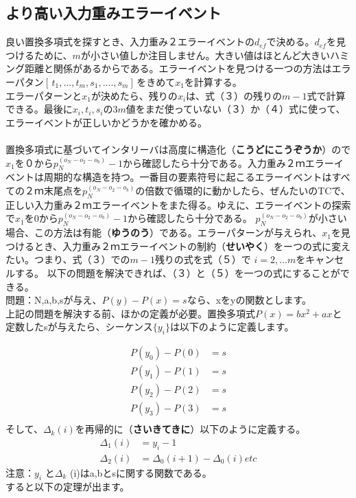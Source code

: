 \documentclass[24 pts]{article}
\begin{document}
\subsection{より高い入力重みエラーイベント}
良い置換多項式を探すとき、入力重み２エラーイベントの$d_{ef}$で決める。$d_{ef}$を見つけるために、$m$が小さい値しか注目しません。大きい値はほとんど大きいハミング距離と関係があるからである。エラーイベントを見つける一つの方法はエラーパタン$[\,t_1,...,t_m,s_1,....,s_m]\,$をきめて$x_1$を計算する。\\エラーパターンと$x_1$が決めたら、残りの$x_i$は、式（３）の残りの$ m-1$式で計算できる。最後に$x_i,t_i,s_i$の$3m$値をまだ使っていない（３）か（４）式に使って、エラーイベントが正しいかどうかを確かめる。
\paragraph{}
置換多項式に基づいてインタリーバは高度に構造化（\textbf{こうどにこうぞうか}）ので$x_1$を０から$p_N^{(o_N-o_2-o_b)}-1$から確認したら十分である。入力重み２ｍエラーイベントは周期的な構造を持つ。一番目の要素符号に起こるエラーイベントはすべての２ｍ末尾点を$p_N^{(o_N-o_2-o_b)}$の倍数で循環的に動かしたら、ぜんたいのTCで、正しい入力重み２ｍエラーイベントをまた得る。ゆえに、エラーイベントの探索で$x_1$を0から$p_N^{(o_N-o_2-o_b)}-1$から確認したら十分である。
$p_N^{(o_N-o_2-o_b)}$が小さい場合、この方法は有能（\textbf{ゆうのう}）である。エラーパターンが与えられ、$x_1$を見つけるとき、入力重み２ｍエラーイベントの制約（\textbf{せいやく}）をーつの式に変えたい。つまり、式（３）での$m-1$残りの式を式（５）で $i=2,…m$をキャンセルする。
以下の問題を解決できれば、（３）と（５）を一つの式にすることができる。\\
問題：N,a,b,sが与え、$ P(y)-P(x)=s$なら、xをyの関数とします。\\上記の問題を解決する前、ほかの定義が必要。置換多項式$ P(x)= bx^2+ax$と定数したsが与えたら、シーケンス$\{y_i\}$は以下のように定義します。

\begin{align*}
P(y_0)-P(0)&=s\\
P(y_1)-P(1)&=s\\
P(y_2)-P(2)&=s\\
P(y_3)-P(3)&=s\\
\tag{16}
\end{align*}
そして、$\Delta_{k }(i)$を再帰的に（\textbf{さいきてきに}）以下のように定義する。
\begin{align*}
\Delta_1(i)&=y_i-1\\
\Delta_2 (i)&= \Delta_0 (i+1)- \Delta_0 (i)etc
\end{align*}
注意：$y_i$ と$\Delta_k$ (i)はa,bとsに関する関数である。\\すると以下の定理が出ます。
\end{document}
